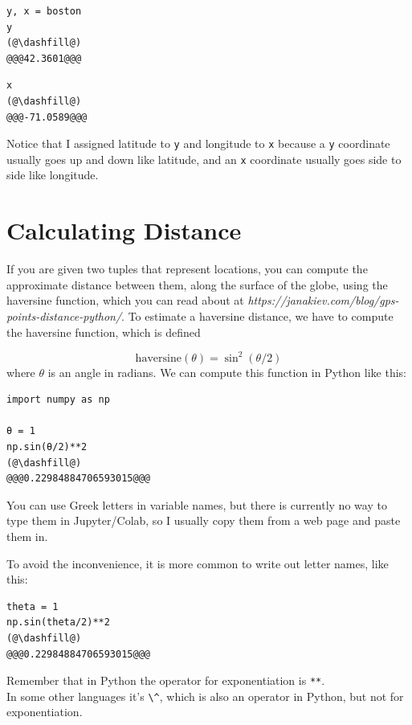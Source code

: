 \begin{lstlisting}[]
y, x = boston
y
(@\dashfill@)
@@@42.3601@@@
\end{lstlisting}

\begin{lstlisting}[]
x
(@\dashfill@)
@@@-71.0589@@@
\end{lstlisting}

Notice that I assigned latitude to \passthrough{\lstinline!y!} and
longitude to \passthrough{\lstinline!x!} because a
\passthrough{\lstinline!y!} coordinate usually goes up and down like
latitude, and an \passthrough{\lstinline!x!} coordinate usually goes
side to side like longitude.

\hypertarget{calculating-distance}{%
\section{Calculating Distance}\label{calculating-distance}}

If you are given two tuples that represent locations, you can compute
the approximate distance between them, along the surface of the globe,
using the haversine function, which you can read about at \emph{https://janakiev.com/blog/gps-points-distance-python/}. To estimate a haversine distance,
we have to compute the haversine function, which is defined

\[\mathrm{haversine}(\theta)=\sin^2(\theta/2)\]
where \(\theta\) is an angle in radians. We can compute this function in
Python like this:

\begin{lstlisting}[]
import numpy as np

θ = 1
np.sin(θ/2)**2
(@\dashfill@)
@@@0.22984884706593015@@@
\end{lstlisting}

You can use Greek letters in variable names, but there is currently no
way to type them in Jupyter/Colab, so I usually copy them from a web
page and paste them in.

To avoid the inconvenience, it is more common to write out letter names,
like this:

\begin{lstlisting}[]
theta = 1
np.sin(theta/2)**2
(@\dashfill@)
@@@0.22984884706593015@@@
\end{lstlisting}

Remember that in Python the operator for exponentiation is
\passthrough{\lstinline!**!}.\\ In some other languages it's \passthrough{\lstinline!\^!}, which is also
an operator in Python, but not for exponentiation.

